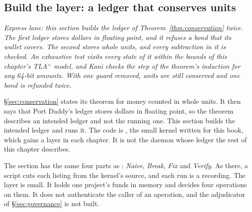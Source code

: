 %
%
\subsection{Build the layer: a ledger that conserves units}
\label{sec:bonded-build}

\noindent\emph{Express lane: this section builds the ledger of
Theorem~\ref{thm:conservation} twice. The first ledger stores dollars in
floating point, and it refuses a bond that its wallet covers. The second
stores whole units, and every subtraction in it is checked. An exhaustive
test visits every state of it within the bounds of this chapter's
TLA$^{+}$ model, and Kani checks the step of the theorem's induction for
any 64-bit amounts. With one guard removed, units are still conserved and
one bond is refunded twice.}

\S\ref{sec:conservation} states its theorem for money counted in whole
units. It then says that Port Daddy's ledger stores dollars in floating
point, so the theorem describes an intended ledger and not the running
one. This section builds the intended ledger and runs it. The code is
\pdkernelname{}, the small kernel written for this book, which gains a
layer in each chapter. It is not the daemon whose ledger the rest of this
chapter describes.

The section has the same four parts as
: \emph{Naive}, \emph{Break},
\emph{Fix} and \emph{Verify}. As there, a script cuts each listing from
the kernel's source, and each run is a recording. The layer is small. It
holds one project's funds in memory and decides four operations on them.
It does not authenticate the caller of an operation, and the adjudicator
of \S\ref{sec:governance} is not built.

